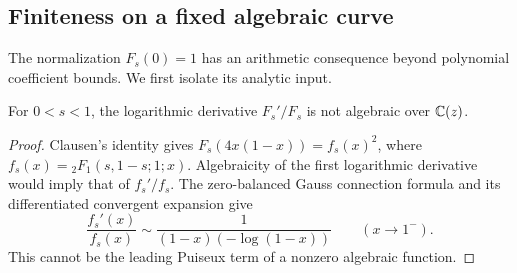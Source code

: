 \subsection{Finiteness on a fixed algebraic curve}

The normalization $F_s(0)=1$ has an arithmetic consequence beyond
polynomial coefficient bounds. We first isolate its analytic input.

\begin{lemma}\label{lem:logderivative-nonalgebraic}
For $0<s<1$, the logarithmic derivative $F_s'/F_s$ is not algebraic
over $\mathbb C(z)$.
\end{lemma}
\begin{proof}
Clausen's identity gives
$F_s(4x(1-x))=f_s(x)^2$, where
$f_s(x)={}_2F_1(s,1-s;1;x)$. Algebraicity of the first logarithmic
derivative would imply that of $f_s'/f_s$. The zero-balanced Gauss
connection formula and its differentiated convergent expansion give
\[
 \frac{f_s'(x)}{f_s(x)}\sim
       \frac1{(1-x)(-\log(1-x))}\qquad(x\to1^-).
\]
This cannot be the leading Puiseux term of a nonzero algebraic function.
\end{proof}

